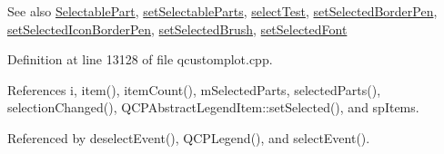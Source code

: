 \begin{DoxySeeAlso}{See also}
\hyperlink{class_q_c_p_legend_a5404de8bc1e4a994ca4ae69e2c7072f1}{Selectable\+Part}, \hyperlink{class_q_c_p_legend_a9ce60aa8bbd89f62ae4fa83ac6c60110}{set\+Selectable\+Parts}, \hyperlink{class_q_c_p_legend_aa3892801051bc7b985e003576df844db}{select\+Test}, \hyperlink{class_q_c_p_legend_a2c35d262953a25d96b6112653fbefc88}{set\+Selected\+Border\+Pen}, \hyperlink{class_q_c_p_legend_ade93aabe9bcccaf9cf46cec22c658027}{set\+Selected\+Icon\+Border\+Pen}, \hyperlink{class_q_c_p_legend_a875227f3219c9799464631dec5e8f1bd}{set\+Selected\+Brush}, \hyperlink{class_q_c_p_legend_ab580a01c3c0a239374ed66c29edf5ad2}{set\+Selected\+Font} 
\end{DoxySeeAlso}


Definition at line 13128 of file qcustomplot.\+cpp.



References i, item(), item\+Count(), m\+Selected\+Parts, selected\+Parts(), selection\+Changed(), Q\+C\+P\+Abstract\+Legend\+Item\+::set\+Selected(), and sp\+Items.



Referenced by deselect\+Event(), Q\+C\+P\+Legend(), and select\+Event().


